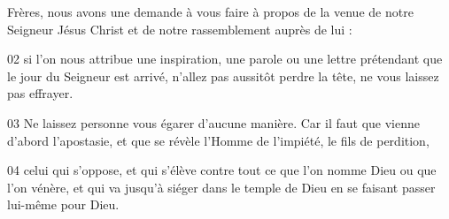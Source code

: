 Frères, nous avons une demande à vous faire à propos de la venue de notre Seigneur Jésus Christ et de notre rassemblement auprès de lui :

02 si l'on nous attribue une inspiration, une parole ou une lettre prétendant que le jour du Seigneur est arrivé, n'allez pas aussitôt perdre la tête, ne vous laissez pas effrayer.

03 Ne laissez personne vous égarer d’aucune manière. Car il faut que vienne d’abord l’apostasie, et que se révèle l’Homme de l’impiété, le fils de perdition,

04 celui qui s’oppose, et qui s’élève contre tout ce que l’on nomme Dieu ou que l’on vénère, et qui va jusqu’à siéger dans le temple de Dieu en se faisant passer lui-même pour Dieu.
